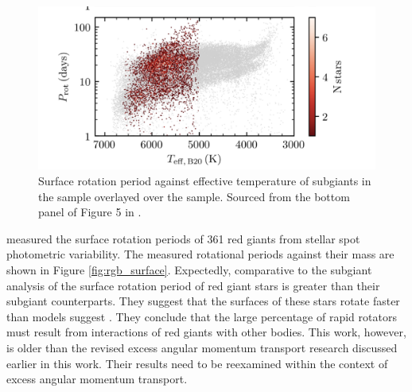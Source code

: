 \begin{figure}[h]
    \includegraphics[width=\textwidth]{Figures/intro_figures/subgiant_surface.png}
    \caption{Surface rotation period against effective temperature of subgiants in the \citet{santos_surface_2021} sample overlayed over the \kepler{} \citet{mcquillan_rotation_2014} sample. 
    Sourced from the bottom panel of Figure 5 in \citep{santos_surface_2021}.}
    \label{fig:subgiant_surface}
\end{figure}

\citet{ceillier_surface_2017} measured the surface rotation periods of 361 red giants from stellar spot photometric variability.
The measured rotational periods against their mass are shown in Figure \ref{fig:rgb_surface}.
Expectedly, comparative to the subgiant analysis of \citet{santos_surface_2021} the surface rotation period of red giant stars is greater than their subgiant counterparts.
They suggest that the surfaces of these stars rotate faster than models suggest \citep{tayar_rapid_2015}.
They conclude that the large percentage of rapid rotators must result from interactions of red giants with other bodies.
This work, however, is older than the revised excess angular momentum transport research discussed earlier in this work.
Their results need to be reexamined within the context of excess angular momentum transport.


